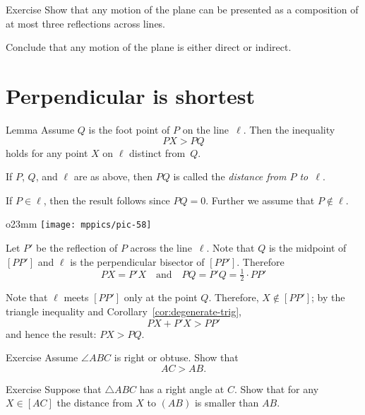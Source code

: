 \begin{thm}{Exercise}\label{ex:3-reflections}
Show that any motion of the plane can be presented as a 
composition of at most three reflections across lines.

Conclude that any motion of the plane is either direct or indirect.
\end{thm} 




\section*{Perpendicular is shortest}

\begin{thm}[\abs]{Lemma}\label{lem:perp<oblique}
Assume $Q$ is the foot point of $P$ on the line~$\ell$.
Then the inequality
$$PX>PQ$$
holds for any point $X$ on $\ell$ distinct from~$Q$. 
\end{thm}

If $P$, $Q$, and $\ell$ are as above, 
then $PQ$ is called the \label{distance!from a point to a line}\emph{distance from $P$ to~$\ell$}. 

If $P\in \ell$, 
then the result follows since $PQ=0$.
Further we assume that $P\notin \ell$.

\begin{wrapfigure}{o}{23mm}
\centering
\texttt{[image: mppics/pic-58]}
\vskip3mm
\end{wrapfigure}

Let $P'$ be the reflection of $P$ across the line~$\ell$.
Note that $Q$ is the midpoint of $[PP']$
and $\ell$ is the perpendicular bisector of $[PP']$.
Therefore
$$PX=P'X
\quad
\text{and}
\quad
PQ=P'Q=\tfrac12\cdot PP'$$

Note that $\ell$ meets $[PP']$ only at the point $Q$.
Therefore, $X\notin [PP']$; by the triangle inequality and Corollary~\ref{cor:degenerate-trig},
$$PX+P'X>PP'$$
and hence the result: $PX>PQ$.
\qeds

\begin{thm}{Exercise}\label{ex:obtuce}
Assume $\angle ABC$ is right or obtuse.
Show that 
\[AC>AB.\]

\end{thm}

\begin{thm}{Exercise}\label{ex:right-triangle-inq}
Suppose that $\triangle ABC$ has a right angle at $C$.
Show that for any $X\in [AC]$ the distance from $X$ to $(AB)$ is smaller than $AB$.
\end{thm}




